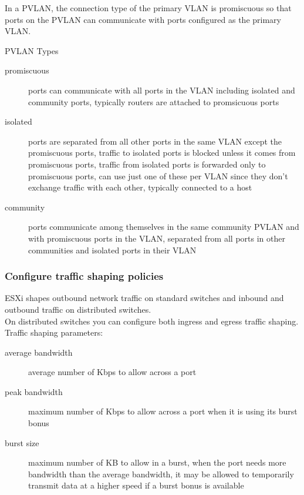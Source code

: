 In a PVLAN, the connection type of the primary VLAN is promiscuous so that
ports on the PVLAN can communicate with ports configured as the primary VLAN.

PVLAN Types

\begin{description}

\item[promiscuous]
ports can communicate with all ports in the VLAN including isolated and
community ports, typically routers are attached to promsicuous ports

\item[isolated]
ports are separated from all other ports in the same VLAN except the
promiscuous ports, traffic to isolated ports is blocked unless it comes from
promiscuous ports, traffic from isolated ports is forwarded only to
promiscuous ports, can use just one of these per VLAN since they don't
exchange traffic with each other, typically connected to a host

\item[community]
ports communicate among themselves in the same community PVLAN and with
promiscuous ports in the VLAN, separated from all ports in other communities
and isolated ports in their VLAN

\end{description}

\subsubsection{Configure traffic shaping policies}

ESXi shapes outbound network traffic on standard switches and inbound and
outbound traffic on distributed switches.\\

On distributed switches you can configure both ingress and egress traffic
shaping.\\

Traffic shaping parameters:

\begin{description}

\item[average bandwidth]
average number of Kbps to allow across a port

\item[peak bandwidth]
maximum number of Kbps to allow across a port when it is using its burst bonus

\item[burst size]
maximum number of KB to allow in a burst, when the port needs more bandwidth
than the average bandwidth, it may be allowed to temporarily transmit data at
a higher speed if a burst bonus is available

\end{description}

